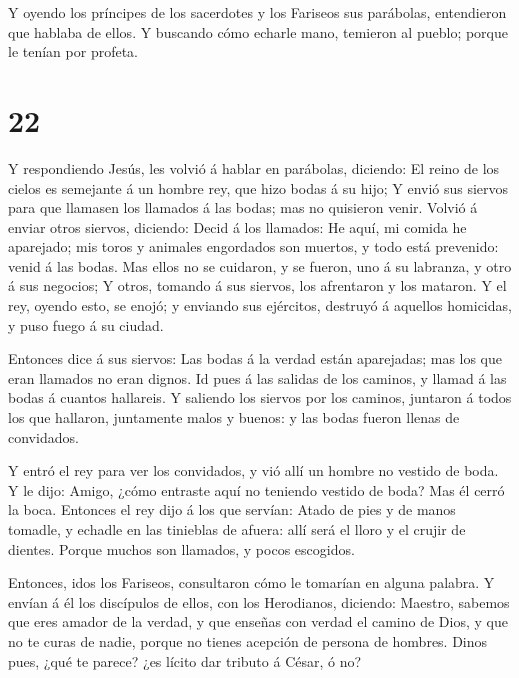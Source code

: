  Y oyendo los príncipes de los sacerdotes y los Fariseos
sus parábolas, entendieron que hablaba de ellos.  Y
buscando cómo echarle mano, temieron al pueblo; porque le tenían por
profeta.

\hypertarget{section-21}{%
\section{22}\label{section-21}}

 Y respondiendo Jesús, les volvió á hablar en parábolas,
diciendo:  El reino de los cielos es semejante á un hombre
rey, que hizo bodas á su hijo;  Y envió sus siervos para que
llamasen los llamados á las bodas; mas no quisieron venir. 
Volvió á enviar otros siervos, diciendo: Decid á los llamados: He aquí,
mi comida he aparejado; mis toros y animales engordados son muertos, y
todo está prevenido: venid á las bodas.  Mas ellos no se
cuidaron, y se fueron, uno á su labranza, y otro á sus negocios;
 Y otros, tomando á sus siervos, los afrentaron y los
mataron.  Y el rey, oyendo esto, se enojó; y enviando sus
ejércitos, destruyó á aquellos homicidas, y puso fuego á su ciudad.

 Entonces dice á sus siervos: Las bodas á la verdad están
aparejadas; mas los que eran llamados no eran dignos.  Id
pues á las salidas de los caminos, y llamad á las bodas á cuantos
hallareis.  Y saliendo los siervos por los caminos,
juntaron á todos los que hallaron, juntamente malos y buenos: y las
bodas fueron llenas de convidados.

 Y entró el rey para ver los convidados, y vió allí un
hombre no vestido de boda.  Y le dijo: Amigo, ¿cómo
entraste aquí no teniendo vestido de boda? Mas él cerró la boca.
 Entonces el rey dijo á los que servían: Atado de pies y de
manos tomadle, y echadle en las tinieblas de afuera: allí será el lloro
y el crujir de dientes.  Porque muchos son llamados, y
pocos escogidos.

 Entonces, idos los Fariseos, consultaron cómo le tomarían
en alguna palabra.  Y envían á él los discípulos de ellos,
con los Herodianos, diciendo: Maestro, sabemos que eres amador de la
verdad, y que enseñas con verdad el camino de Dios, y que no te curas de
nadie, porque no tienes acepción de persona de hombres. 
Dinos pues, ¿qué te parece? ¿es lícito dar tributo á César, ó no?

